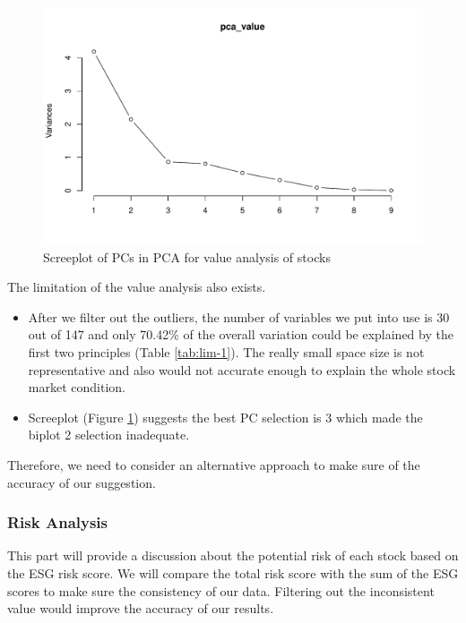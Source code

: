 \documentclass[11pt,a4paper,]{article}
\providecommand{\tightlist}{%
  \setlength{\itemsep}{0pt}\setlength{\parskip}{0pt}}
\begin{document}
\begin{figure}
\centering
\includegraphics{ass2_files/figure-latex/lim-2-1.pdf}
\caption{\label{fig:lim-2}Screeplot of PCs in PCA for value analysis of stocks}
\end{figure}

The limitation of the value analysis also exists.

\begin{itemize}
\tightlist
\item
  After we filter out the outliers, the number of variables we put into use is 30 out of 147 and only 70.42\% of the overall variation could be explained by the first two principles (Table \ref{tab:lim-1}). The really small space size is not representative and also would not accurate enough to explain the whole stock market condition.
\item
  Screeplot (Figure \ref{fig:lim-2}) suggests the best PC selection is 3 which made the biplot 2 selection inadequate.
\end{itemize}

Therefore, we need to consider an alternative approach to make sure of the accuracy of our suggestion.

\hypertarget{risk-analysis}{%
\subsubsection{Risk Analysis}\label{risk-analysis}}

This part will provide a discussion about the potential risk of each stock based on the ESG risk score. We will compare the total risk score with the sum of the ESG scores to make sure the consistency of our data. Filtering out the inconsistent value would improve the accuracy of our results.
\end{document}
